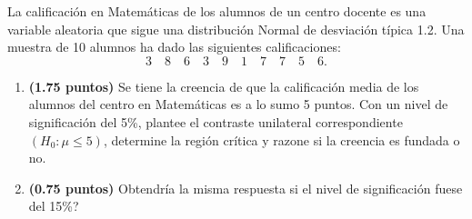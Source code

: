 
La calificación en Matemáticas de los alumnos de un centro docente es una variable aleatoria que sigue una distribución Normal de desviación típica 1.2. Una muestra de 10 alumnos ha dado las siguientes calificaciones:
\[
3\quad8\quad6\quad3\quad9\quad1\quad7\quad7\quad5\quad6.
\]
\begin{enumerate}[label=\alph*)]
\item \textbf{(1.75 puntos)} Se tiene la creencia de que la calificación media de los alumnos del centro en Matemáticas es a lo sumo 5 puntos. Con un nivel de significación del 5\%, plantee el contraste unilateral correspondiente $(H_0:\mu\leq5)$, determine la región crítica y razone si la creencia es fundada o no.
\item \textbf{(0.75 puntos)} \textquestiondown{}Obtendría la misma respuesta si el nivel de significación fuese del 15\%?
\end{enumerate}
